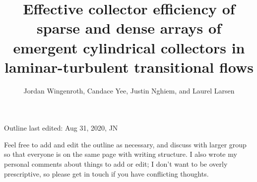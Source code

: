 \documentclass{scrreprt}
\author{Jordan Wingenroth, Candace Yee, Justin Nghiem, and Laurel Larsen}
\title{Effective collector efficiency of sparse and dense arrays of emergent cylindrical collectors in laminar-turbulent transitional flows}
\begin{document}
\maketitle

%

Outline last edited: Aug 31, 2020, JN

Feel free to add and edit the outline as necessary, and discuss with larger group so that everyone is on the same page with writing structure. I also wrote my personal comments about things to add or edit; I don't want to be overly prescriptive, so please get in touch if you have conflicting thoughts.
\end{document}
